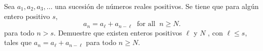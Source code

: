 Sea $a_1, a_2, a_3, \dots$ una sucesión de números reales positivos. Se tiene que para algún
entero positivo $s$,
\[a_n = a_{\ell} + a_{n - \ell} \ \textrm{ for all } \ n \geq N.\]
para todo $n > s$. Demuestre que existen enteros positivos $\ell$ y $N$ , con $\ell \leq s$, tales que $a_n = a_{\ell} + a_{n-\ell}$ para todo $n \geq N$.